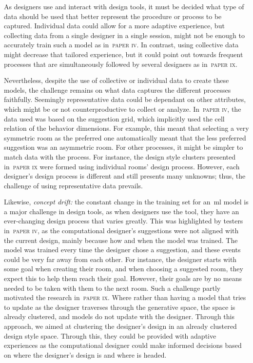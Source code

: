 As designers use and interact with design tools, it must be decided what type of data should be used that better represent the procedure or process to be captured. Individual data could allow for a more adaptive experience, but collecting data from a single designer in a single session, might not be enough to accurately train such a model as in~\textsc{paper iv}. In contrast, using collective data might decrease that tailored experience, but it could point out towards frequent processes that are simultaneously followed by several designers as in~\textsc{paper ix}.

Nevertheless, despite the use of collective or individual data to create these models, the challenge remains on what data captures the different processes faithfully. Seemingly representative data could be dependant on other attributes, which might be or not counterproductive to collect or analyze. In~\textsc{paper iv}, the data used was based on the suggestion grid, which implicitly used the cell relation of the behavior dimensions. For example, this meant that selecting a very symmetric room as the preferred one automatically meant that the less preferred suggestion was an asymmetric room. For other processes, it might be simpler to match data with the process. For instance, the design style clusters presented in~\textsc{paper ix} were formed using individual rooms' design process. However, each designer's design process is different and still presents many unknowns; thus, the challenge of using representative data prevails.

Likewise, \emph{concept drift:} the constant change in the training set for an~\acrshort{ml} model is a major challenge in design tools, as when designers use the tool, they have an ever-changing design process that varies greatly. This was highlighted by testers in~\textsc{paper iv}, as the computational designer's suggestions were not aligned with the current design, mainly because how and when the model was trained. The model was trained every time the designer chose a suggestion, and these events could be very far away from each other. For instance, the designer starts with some goal when creating their room, and when choosing a suggested room, they expect this to help them reach their goal. However, their goals are by no means needed to be taken with them to the next room. Such a challenge partly motivated the research in~\textsc{paper ix}. Where rather than having a model that tries to update as the designer traverses through the generative space, the space is already clustered, and models do not update with the designer. Through this approach, we aimed at clustering the designer's design in an already clustered design style space. Through this, they could be provided with adaptive experiences as the computational designer could make informed decisions based on where the designer's design is and where is headed. 



